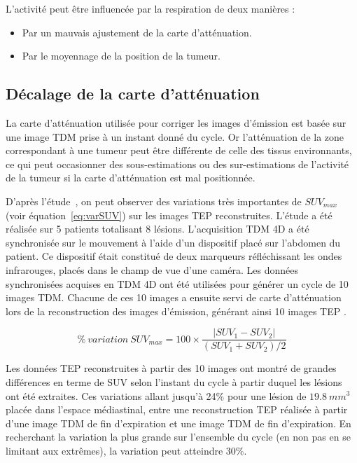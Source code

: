 L'activité peut être influencée par la respiration de deux manières : 
\begin{itemize}
 \item Par un mauvais ajustement de la carte d'atténuation.
 \item Par le moyennage de la position de la tumeur.
\end{itemize}


\subsection{Décalage de la carte d'atténuation}

La carte d'atténuation utilisée pour corriger les images d'émission est basée sur une image TDM prise à un instant donné du cycle. Or l'atténuation de la zone correspondant à une tumeur peut être différente de celle des tissus environnants, ce qui peut occasionner des sous-estimations ou des sur-estimations de l'activité de la tumeur si la carte d'atténuation est mal positionnée.

D'après l'étude~\cite{erdi2004ct}, on peut observer des variations très importantes de $SUV_{max}$ (voir équation~\ref{eq:varSUV}) sur les images TEP reconstruites. L'étude a été réalisée sur 5 patients totalisant 8 lésions. L'acquisition TDM 4D a été synchronisée sur le mouvement à l'aide d'un dispositif placé sur l'abdomen du patient. Ce dispositif était constitué de deux marqueurs réfléchissant les ondes infrarouges, placés dans le champ de vue d'une caméra. Les données synchronisées acquises en TDM 4D ont été utilisées pour générer un cycle de 10 images TDM. Chacune de ces 10 images a ensuite servi de carte d'atténuation lors de la reconstruction des images d'émission, générant ainsi 10 images TEP .

\begin{equation}
\label{eq:varSUV}
 \%~variation~SUV_{max} = 100 \times \frac{ | SUV_1 - SUV_2 | }{ (SUV_1 + SUV_2) / 2 }
\end{equation}


Les données TEP reconstruites à partir des 10 images ont montré de grandes différences en terme de SUV selon l'instant du cycle à partir duquel les lésions ont été extraites.
Ces variations allant jusqu'à 24\% pour une lésion de $19.8~mm^3$ placée dans l'espace médiastinal, entre une reconstruction TEP réalisée à partir d'une image TDM de fin d'expiration et une image TDM de fin d'expiration. En recherchant la variation la plus grande sur l'ensemble du cycle (en non pas en se limitant aux extrêmes), la variation peut atteindre 30\%.

